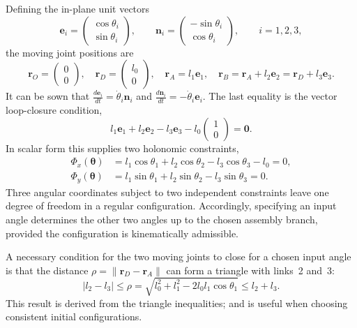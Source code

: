 Defining the in-plane unit vectors
\begin{equation}
    \mathbf e_i=\begin{pmatrix}\cos\theta_i\\\sin\theta_i\end{pmatrix},
    \qquad
    \mathbf n_i=\begin{pmatrix}-\sin\theta_i\\\cos\theta_i\end{pmatrix},
    \qquad i=1,2,3,
\end{equation}
the moving joint positions are
\begin{equation}
    \mathbf r_O=\begin{pmatrix}0\\0\end{pmatrix},\quad
    \mathbf r_D=\begin{pmatrix}l_0\\0\end{pmatrix},\quad
    \mathbf r_A=l_1\mathbf e_1,\quad
    \mathbf r_B=\mathbf r_A+l_2\mathbf e_2=\mathbf r_D+l_3\mathbf e_3.
\end{equation}
It can be sown that $\frac{d \mathbf e_i}{dt} = \dot \theta_i \mathbf n_i$ and
$\frac{d \mathbf n_i}{dt} = - \dot \theta_i \mathbf e_i$. The last equality is the vector loop-closure condition,
\begin{equation}
    l_1\mathbf e_1+l_2\mathbf e_2-l_3\mathbf e_3-l_0\begin{pmatrix}1\\0\end{pmatrix}=\mathbf0.
    \label{eq:fourbar_vector_closure}
\end{equation}
In scalar form this supplies two holonomic constraints,
\begin{align}
    \Phi_x(\boldsymbol\theta)
    &=l_1\cos\theta_1+l_2\cos\theta_2-l_3\cos\theta_3-l_0=0,\\
    \Phi_y(\boldsymbol\theta)
    &=l_1\sin\theta_1+l_2\sin\theta_2-l_3\sin\theta_3=0.
    \label{eq:fourbar_closure}
\end{align}
Three angular coordinates subject to two independent constraints leave one degree of freedom in a regular configuration. Accordingly, specifying an input angle determines the other two angles up to the chosen assembly branch, provided the configuration is kinematically admissible.

A necessary condition for the two moving joints to close for a chosen input angle is that the distance $\rho=\lVert\mathbf r_D-\mathbf r_A\rVert$ can form a triangle with links~2 and~3:
\begin{equation}
    |l_2-l_3|\leq\rho=\sqrt{l_0^2+l_1^2-2l_0l_1\cos\theta_1}\leq l_2+l_3.
\end{equation}
This result is derived from the triangle inequalities; and is useful when choosing consistent initial configurations.

